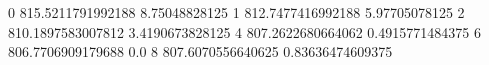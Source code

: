 0 815.5211791992188 8.75048828125
1 812.7477416992188 5.97705078125
2 810.1897583007812 3.4190673828125
4 807.2622680664062 0.4915771484375
6 806.7706909179688 0.0
8 807.6070556640625 0.83636474609375
